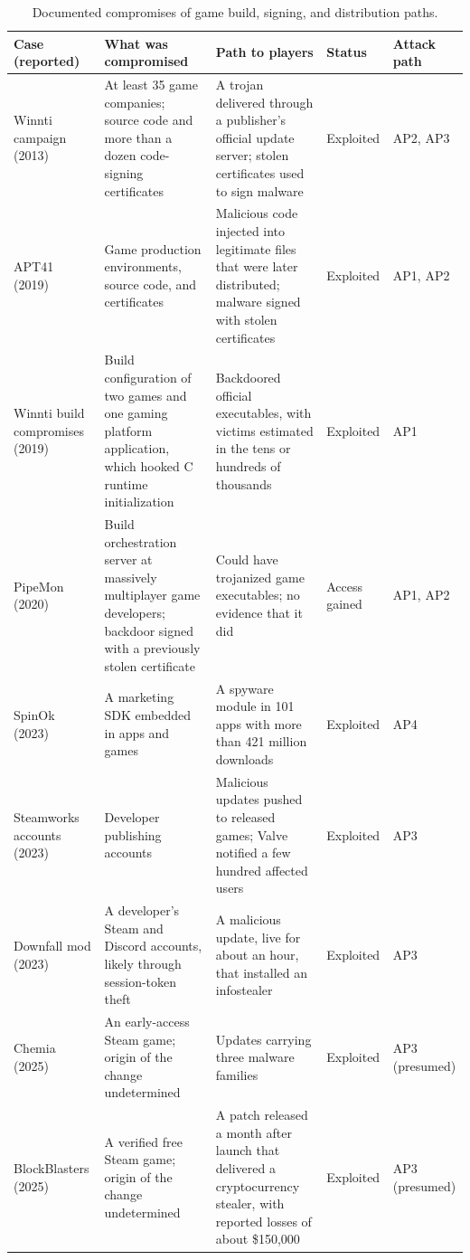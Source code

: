 \documentclass[acmsmall,screen,review]{acmart}
\begin{document}
\begin{table}[htbp]
\caption{Documented compromises of game build, signing, and distribution paths.}
\label{tab:1}
\footnotesize
\begin{tabularx}{\linewidth}{@{}>{\hsize=0.974\hsize\raggedright\arraybackslash}X>{\hsize=1.293\hsize\raggedright\arraybackslash}X>{\hsize=1.293\hsize\raggedright\arraybackslash}X>{\hsize=0.684\hsize\raggedright\arraybackslash}X>{\hsize=0.756\hsize\raggedright\arraybackslash}X@{}}
\toprule
\textbf{Case (reported)} & \textbf{What was compromised} & \textbf{Path to players} & \textbf{Status} & \textbf{Attack path} \\
\midrule
Winnti campaign \cite{kaspersky2013winnti} (2013) & At least 35 game companies; source code and more than a dozen code-signing certificates & A trojan delivered through a publisher's official update server; stolen certificates used to sign malware & Exploited & AP2, AP3 \\
APT41 \cite{mandiant2019apt41} (2019) & Game production environments, source code, and certificates & Malicious code injected into legitimate files that were later distributed; malware signed with stolen certificates & Exploited & AP1, AP2 \\
Winnti build compromises \cite{eset2019gaming} (2019) & Build configuration of two games and one gaming platform application, which hooked C runtime initialization & Backdoored official executables, with victims estimated in the tens or hundreds of thousands & Exploited & AP1 \\
PipeMon \cite{eset2020winnti} (2020) & Build orchestration server at massively multiplayer game developers; backdoor signed with a previously stolen certificate & Could have trojanized game executables; no evidence that it did & Access gained & AP1, AP2 \\
SpinOk \cite{doctor2023android} (2023) & A marketing SDK embedded in apps and games & A spyware module in 101 apps with more than 421 million downloads & Exploited & AP4 \\
Steamworks accounts \cite{toulas2023steam} (2023) & Developer publishing accounts & Malicious updates pushed to released games; Valve notified a few hundred affected users & Exploited & AP3 \\
Downfall mod \cite{gatlan2023steam} (2023) & A developer's Steam and Discord accounts, likely through session-token theft & A malicious update, live for about an hour, that installed an infostealer & Exploited & AP3 \\
Chemia \cite{mott2025hacker} (2025) & An early-access Steam game; origin of the change undetermined & Updates carrying three malware families & Exploited & AP3 (presumed) \\
BlockBlasters \cite{toulas2025verified,tan2025infected} (2025) & A verified free Steam game; origin of the change undetermined & A patch released a month after launch that delivered a cryptocurrency stealer, with reported losses of about \$150,000 & Exploited & AP3 (presumed) \\
\bottomrule
\end{tabularx}
\end{table}
\end{document}
